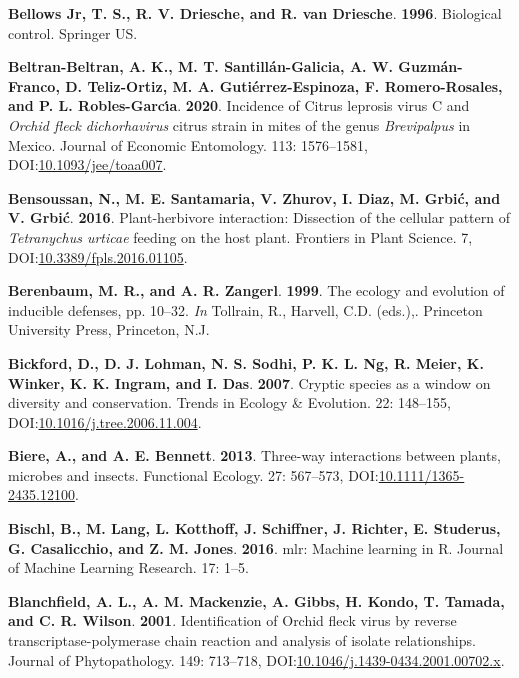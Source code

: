 \documentclass[12pt,final,CPage]{ufthesis}
\newlength{\cslhangindent}
\newenvironment{CSLReferences}[2] %
{%
	\setlength{\parindent}{0pt}
	\ifodd #1 \everypar{\setlength{\hangindent}{\cslhangindent}}\ignorespaces\fi
	\ifnum #2 > 0
	\setlength{\parskip}{#2\baselineskip}
	\fi
}%
{}
\begin{document}
{\begin{CSLReferences}{1}{0}
  \leavevmode{}%
  \textbf{Bellows Jr, T. S., R. V. Driesche, and R. van Driesche}. \textbf{1996}. Biological control. Springer US.

  \leavevmode{}%
  \textbf{Beltran-Beltran, A. K., M. T. Santillán-Galicia, A. W. Guzmán-Franco, D. Teliz-Ortiz, M. A. Gutiérrez-Espinoza, F. Romero-Rosales, and P. L. Robles-Garcı́a}. \textbf{2020}. Incidence of {Citrus leprosis virus} {C} and {\emph{Orchid fleck dichorhavirus}} citrus strain in mites of the genus {\emph{Brevipalpus}} in {Mexico}. Journal of Economic Entomology. 113: 1576--1581, DOI:\href{https://doi.org/10.1093/jee/toaa007}{10.1093/jee/toaa007}.

  \leavevmode{}%
  \textbf{Bensoussan, N., M. E. Santamaria, V. Zhurov, I. Diaz, M. Grbić, and V. Grbić}. \textbf{2016}. Plant-herbivore interaction: Dissection of the cellular pattern of {\emph{Tetranychus urticae}} feeding on the host plant. Frontiers in Plant Science. 7, DOI:\href{https://doi.org/10.3389/fpls.2016.01105}{10.3389/fpls.2016.01105}.

  \leavevmode{}%
  \textbf{Berenbaum, M. R., and A. R. Zangerl}. \textbf{1999}. The ecology and evolution of inducible defenses, pp. 10--32. \emph{In} Tollrain, R., Harvell, C.D. (eds.),. Princeton University Press, Princeton, N.J.

  \leavevmode{}%
  \textbf{Bickford, D., D. J. Lohman, N. S. Sodhi, P. K. L. Ng, R. Meier, K. Winker, K. K. Ingram, and I. Das}. \textbf{2007}. Cryptic species as a window on diversity and conservation. Trends in Ecology {\&} Evolution. 22: 148--155, DOI:\href{https://doi.org/10.1016/j.tree.2006.11.004}{10.1016/j.tree.2006.11.004}.

  \leavevmode{}%
  \textbf{Biere, A., and A. E. Bennett}. \textbf{2013}. Three-way interactions between plants, microbes and insects. Functional Ecology. 27: 567--573, DOI:\href{https://doi.org/10.1111/1365-2435.12100}{10.1111/1365-2435.12100}.

  \leavevmode{}%
  \textbf{Bischl, B., M. Lang, L. Kotthoff, J. Schiffner, J. Richter, E. Studerus, G. Casalicchio, and Z. M. Jones}. \textbf{2016}. {mlr}: Machine learning in {R}. Journal of Machine Learning Research. 17: 1--5.

  \leavevmode{}%
  \textbf{Blanchfield, A. L., A. M. Mackenzie, A. Gibbs, H. Kondo, T. Tamada, and C. R. Wilson}. \textbf{2001}. Identification of {Orchid fleck virus} by reverse transcriptase-polymerase chain reaction and analysis of isolate relationships. Journal of Phytopathology. 149: 713--718, DOI:\href{https://doi.org/10.1046/j.1439-0434.2001.00702.x}{10.1046/j.1439-0434.2001.00702.x}.


\end{CSLReferences}}
\end{document}
